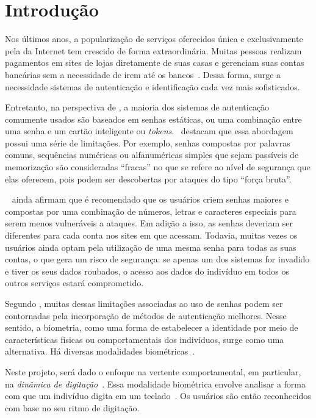 \section{Introdução}\label{sec:introduacao}

Nos últimos anos, a popularização de serviços oferecidos única e exclusivamente pela da Internet tem crescido de forma extraordinária. Muitas pessoas realizam pagamentos em sites de lojas diretamente de suas casas e gerenciam suas contas bancárias sem a necessidade de irem até os bancos~\cite{seguranca_de_dados}. Dessa forma, surge a necessidade sistemas de autenticação e identificação cada vez mais sofisticados.

Entretanto, na perspectiva de , a maioria dos sistemas de autenticação comumente usados são baseados em senhas estáticas, ou uma combinação entre uma senha e um cartão inteligente ou \textit{tokens}.~ destacam que essa abordagem possui uma série de limitações. Por exemplo, senhas compostas por palavras comuns, sequências numéricas ou alfanuméricas simples que sejam passíveis de memorização são consideradas ``fracas'' no que se refere ao nível de segurança que elas oferecem, pois podem ser descobertas por ataques do tipo ``força bruta''.

~ ainda afirmam que é recomendado que os usuários criem senhas maiores e compostas por uma combinação de números, letras e caracteres especiais para serem menos vulneráveis a ataques. Em adição a isso, as senhas deveriam ser diferentes para cada conta nos sites em que acessam. Todavia, muitas vezes os usuários ainda optam pela utilização de uma mesma senha para todas as suas contas, o que gera um risco de segurança: se apenas um dos sistemas for invadido e tiver os seus dados roubados, o acesso aos dados do indivíduo em todos os outros serviços estará comprometido.

Segundo , muitas dessas limitações associadas ao uso de senhas podem ser contornadas pela incorporação de métodos de autenticação melhores. Nesse sentido, a biometria, como uma forma de estabelecer a identidade por meio de características físicas ou comportamentais dos indivíduos, surge como uma alternativa. Há diversas modalidades biométricas~\cite{Jain2016_50Years}.

Neste projeto, será dado o enfoque na vertente comportamental, em particular, na \textit{dinâmica de digitação}~\cite{Roy2022systematic}. Essa modalidade biométrica envolve analisar a forma com que um indivíduo digita em um teclado~\cite{monrose2000keystroke}. Os usuários são então reconhecidos com base no seu ritmo de digitação.

